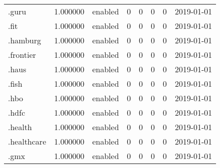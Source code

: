 \begin{tabular}{lrlrrrrl}
.guru                     &          1.000000 &         enabled &                           0 &                           0 &                           0 &                   0 &           2019-01-01 \\
.fit                      &          1.000000 &         enabled &                           0 &                           0 &                           0 &                   0 &           2019-01-01 \\
.hamburg                  &          1.000000 &         enabled &                           0 &                           0 &                           0 &                   0 &           2019-01-01 \\
.frontier                 &          1.000000 &         enabled &                           0 &                           0 &                           0 &                   0 &           2019-01-01 \\
.haus                     &          1.000000 &         enabled &                           0 &                           0 &                           0 &                   0 &           2019-01-01 \\
.fish                     &          1.000000 &         enabled &                           0 &                           0 &                           0 &                   0 &           2019-01-01 \\
.hbo                      &          1.000000 &         enabled &                           0 &                           0 &                           0 &                   0 &           2019-01-01 \\
.hdfc                     &          1.000000 &         enabled &                           0 &                           0 &                           0 &                   0 &           2019-01-01 \\
.health                   &          1.000000 &         enabled &                           0 &                           0 &                           0 &                   0 &           2019-01-01 \\
.healthcare               &          1.000000 &         enabled &                           0 &                           0 &                           0 &                   0 &           2019-01-01 \\
.gmx                      &          1.000000 &         enabled &                           0 &                           0 &                           0 &                   0 &           2019-01-01 \\

\end{tabular}
